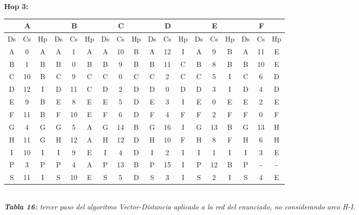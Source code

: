 \documentclass[letterpaper,10pt,onecolumn,titlepage]{article}
\begin{document}
\textbf{Hop 3:}
 \begin{center}
   \begin{tabular}{|c|c|c|c|c|c|c|c|c|c|c|c|c|c|c|c|c|c|} \hline
     \multicolumn{3}{|c|}{A} & \multicolumn{3}{|c|}{B} & \multicolumn{3}{|c|}{C} & \multicolumn{3}{|c|}{D} & \multicolumn{3}{|c|}{E} & \multicolumn{3}{|c|}{F} \\ \hline
     Ds & Cs & Hp & Ds & Cs & Hp & Ds & Cs & Hp & Ds & Cs & Hp & Ds & Cs & Hp & Ds & Cs & Hp \\ \hline
     A  & 0  & A  & A  & 1  & A  & A  & 10  & B  & A  & 12  & I  & A  & 9  & B  & A  & \color{red}11  & \color{red}E \\ \hline
     B  & 1  & B  & B  & 0  & B  & B  & 9  & B  & B  & 11  & C  & B  & 8  & B & B  & 10  & E \\ \hline
     C  & 10  & B  & C  & 9  & C  & C  & 0  & C  & C  & 2  & C  & C  &\color{red} 5  & \color{red}I  & C  & 6  & D \\ \hline
     D  & 12  & I  & D  & 11  & C & D  & 2  & D  & D  & 0  & D  & D  & 3  & I  & D  & 4  & D \\ \hline
     E  & 9  & B  & E  & 8  & E  & E  &\color{red} 5  & \color{red}D  & E  & 3  & I  & E  & 0  & E  & E  & 2  & E \\ \hline
     F  &\color{red} 11  & \color{red}B  & F  & 10  & E  & F  & 6  & D  & F  & 4  & F  & F  & 2  & F  & F  & 0  & F \\ \hline
     G  & 4  & G  & G  & 5  & A  & G  & \color{red}14  & \color{red}B  & G  &\color{red} 16  &\color{red} I  & G  & \color{red}13  &\color{red} B  & G  & 13  & H \\ \hline
     H  & 11  & G  & H  & \color{red}12  & \color{red}A  & H  & \color{red}12  & \color{red}D  & H  & 10  & F  & H  & 8  & F  & H  & 6  & H \\ \hline
     I  & 10  & I  & I  & 9  & E  & I  & 4  & D  & I  & 2  & I  & I  & 1  & I  & I  & 3  & E \\ \hline
     P  & 3  & P  & P  & 4  & A  & P  & \color{red}13  & \color{red}B  & P  & \color{red}15  &\color{red} I  & P  & \color{red}12  & \color{red}B  & P  & -  & - \\ \hline
     S  & 11  & I  & S  & \color{red}10  & \color{red}E  & S  & \color{red}5  & \color{red}D  & S  & 3  & I  & S  & 2  & I  & S  & \color{red}4  & \color{red}E \\ \hline
   \end{tabular}\\
   \textit{\textbf{Tabla 16:} tercer paso del algoritmo Vector-Distancia aplicado a la red del enunciado, no considerando arco H-I.}
 \end{center}
 
\end{document}
